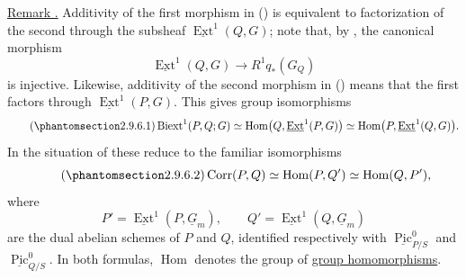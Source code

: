 \underline{Remark .} Additivity of the first morphism in
() is equivalent to factorization of the second through the
subsheaf $\underline{\operatorname{Ext}}^1(Q,G)$; note that, by ,
the canonical morphism
\[
 \underline{\operatorname{Ext}}^1(Q,G)
 \longrightarrow R^1q_*(G_Q)
\]
is injective. Likewise, additivity of the second morphism in
() means that the first factors through
$\underline{\operatorname{Ext}}^1(P,G)$. This gives group
isomorphisms
\begin{equation}\tag{\SGARefTarget{sga7.sga7i.evii.n2-9-6-1}{2.9.6.1}}
 \operatorname{Biext}^{1}(P,Q;G)
 \simeq
 \operatorname{Hom}\bigl(Q,\underline{\operatorname{Ext}}^1(P,G)\bigr)
 \simeq
 \operatorname{Hom}\bigl(P,\underline{\operatorname{Ext}}^1(Q,G)\bigr).
\end{equation}
In the situation of  these reduce to the familiar isomorphisms
\begin{equation}\tag{\SGARefTarget{sga7.sga7i.evii.n2-9-6-2}{2.9.6.2}}
 \operatorname{Corr}(P,Q)
 \simeq \operatorname{Hom}(P,Q')
 \simeq \operatorname{Hom}(Q,P'),
\end{equation}
where
\[
 P'=\underline{\operatorname{Ext}}^1(P,\underline G_m),
 \qquad
 Q'=\underline{\operatorname{Ext}}^1(Q,\underline G_m)
\]
are the dual abelian schemes of $P$ and $Q$, identified respectively
with $\underline{\operatorname{Pic}}^0_{P/S}$ and
$\underline{\operatorname{Pic}}^0_{Q/S}$. In both formulas,
$\operatorname{Hom}$ denotes the group of \underline{group
homomorphisms}.

